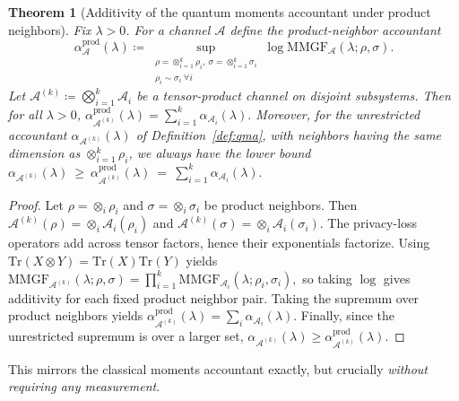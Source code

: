 \documentclass[11pt]{article}
\theoremstyle{plain}
\newtheorem{theorem}[theo]{Theorem}
\theoremstyle{remark}
\begin{document}
\begin{theorem}[Additivity of the quantum moments accountant under product neighbors]
\label{thm:qma-additivity-product}
Fix $\lambda>0$. For a channel $\mathcal A$ define the \emph{product-neighbor accountant}
\[
\alpha_{\mathcal A}^{\mathrm{prod}}(\lambda)
\coloneqq\sup_{\substack{\rho=\otimes_{i=1}^k\rho_i,\ \sigma=\otimes_{i=1}^k\sigma_i\\ \rho_i\sim\sigma_i\ \forall i}}
\log \mathrm{MMGF}_{\mathcal A}(\lambda;\rho,\sigma).
\]
Let $\mathcal A^{(k)}\coloneqq\bigotimes_{i=1}^k \mathcal A_i$ be a tensor-product channel on disjoint subsystems.
Then for all $\lambda>0$,
$
\alpha_{\mathcal A^{(k)}}^{\mathrm{prod}}(\lambda)=\sum_{i=1}^k \alpha_{\mathcal A_i}(\lambda).
$
Moreover, for the \emph{unrestricted} accountant $\alpha_{\mathcal A^{(k)}}(\lambda)$ of Definition~\ref{def:qma}, {with neighbors having the same dimension as $\otimes_{i=1}^k \rho_i$},
we always have the lower bound \\
$
\alpha_{\mathcal A^{(k)}}(\lambda)\ \ge\ \alpha_{\mathcal A^{(k)}}^{\mathrm{prod}}(\lambda)
\ =\ \sum_{i=1}^k \alpha_{\mathcal A_i}(\lambda).
$
\end{theorem}

\begin{proof}
Let $\rho=\otimes_i \rho_i$ and $\sigma=\otimes_i \sigma_i$ be product neighbors.
Then $\mathcal A^{(k)}(\rho)=\otimes_i \mathcal A_i(\rho_i)$ and $\mathcal A^{(k)}(\sigma)=\otimes_i \mathcal A_i(\sigma_i)$.
The privacy-loss operators add across tensor factors, hence their exponentials factorize.
Using $\mathrm{Tr}(X\otimes Y)=\mathrm{Tr}(X)\mathrm{Tr}(Y)$ yields
$
\mathrm{MMGF}_{\mathcal A^{(k)}}(\lambda;\rho,\sigma)
=\prod_{i=1}^k \mathrm{MMGF}_{\mathcal A_i}(\lambda;\rho_i,\sigma_i),
$
so taking $\log$ gives additivity for each fixed product neighbor pair.
Taking the supremum over product neighbors yields
$\alpha_{\mathcal A^{(k)}}^{\mathrm{prod}}(\lambda)=\sum_i \alpha_{\mathcal A_i}(\lambda)$.
Finally, since the unrestricted supremum is over a larger set,
$\alpha_{\mathcal A^{(k)}}(\lambda)\ge \alpha_{\mathcal A^{(k)}}^{\mathrm{prod}}(\lambda)$.
\end{proof}

This mirrors the classical moments accountant exactly, but crucially
\emph{without requiring any measurement}.
\end{document}
